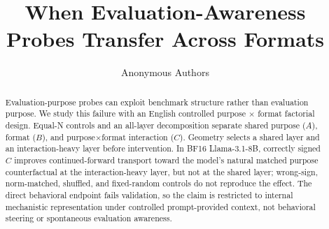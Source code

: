 \documentclass{article}
\title{When Evaluation-Awareness Probes Transfer Across Formats}
\author{Anonymous Authors}
\begin{document}
\maketitle
\begin{abstract}
Evaluation-purpose probes can exploit benchmark structure rather than evaluation purpose. We study this failure with an English controlled purpose $\times$ format factorial design. Equal-N controls and an all-layer decomposition separate shared purpose ($A$), format ($B$), and purpose$\times$format interaction ($C$). Geometry selects a shared layer and an interaction-heavy layer before intervention. In BF16 Llama-3.1-8B, correctly signed $C$ improves continued-forward transport toward the model's natural matched purpose counterfactual at the interaction-heavy layer, but not at the shared layer; wrong-sign, norm-matched, shuffled, and fixed-random controls do not reproduce the effect. The direct behavioral endpoint fails validation, so the claim is restricted to internal mechanistic representation under controlled prompt-provided context, not behavioral steering or spontaneous evaluation awareness.
\end{abstract}














\appendix

\end{document}
